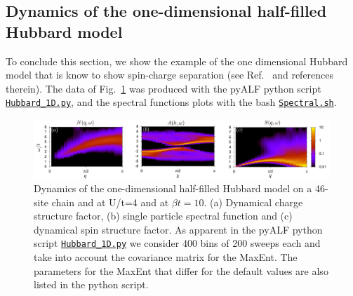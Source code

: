  \subsection{Dynamics of the one-dimensional half-filled Hubbard model}

To conclude this section, we   show the example of the one dimensional Hubbard model that is know to  show spin-charge separation (see Ref.~\cite{Abendschein06}  and references therein).    The data of Fig.~\ref{Fig:Spectral1D}    was produced with the pyALF python script  \href{https://git.physik.uni-wuerzburg.de/ALF/ALF/-/blob/master/Documentation/Figures/MaxEnt/Hubbard_1D.py}{\texttt{Hubbard\_1D.py}}, and   the  spectral functions plots with the bash \href{https://git.physik.uni-wuerzburg.de/ALF/ALF/-/blob/master/Documentation/Figures/MaxEnt/Spectral.sh}{\texttt{Spectral.sh}}. 

\begin{figure}
\center
\includegraphics[width=\textwidth]{Figures/MaxEnt/Spectral_1D.pdf}

\caption{Dynamics of the one-dimensional half-filled Hubbard model  on a 46-site chain   and at U/t=4 and at $\beta t = 10$.  (a) Dynamical charge structure factor, (b) single particle spectral function and (c) dynamical spin structure factor.   As apparent in the pyALF python script 
 \href{https://git.physik.uni-wuerzburg.de/ALF/ALF/-/blob/master/Documentation/Figures/MaxEnt/Hubbard_1D.py}{\texttt{Hubbard\_1D.py}}  we consider 400  bins of 200 sweeps  each and  take into account the covariance matrix for the MaxEnt.  The parameters for the MaxEnt  that differ for the default values are also listed in the  python script.}
        \label{Fig:Spectral1D}
\end{figure}
